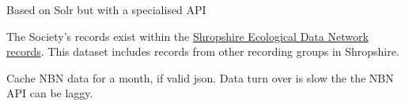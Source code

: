 \documentclass[a4paper,12pt,landscape]{article}
\begin{document}
\begin{multicols*}{2}
  Based on Solr but with a specialised API

  The Society's records exist within
  the \href{https://registry.nbnatlas.org/public/show/dp120}{Shropshire Ecological Data Network records}.
  This dataset includes records from other recording groups in Shropshire.

  \begin{description}
    \item Cache NBN data for a month, if valid json.
      Data turn over is slow the the NBN API can be laggy. 
    \item[] 
  \end{description} 

\end{multicols*}

\end{document}
